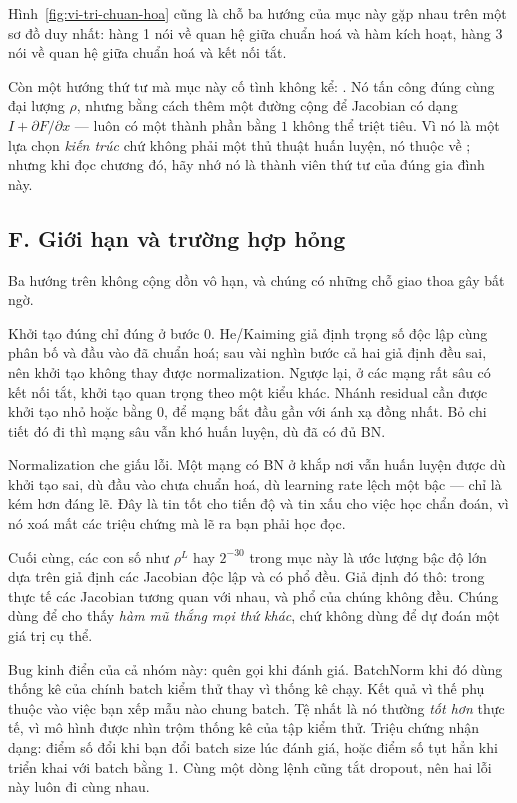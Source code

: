 \documentclass[../../../deep_learning.tex]{subfiles}
\begin{document}
Hình~\ref{fig:vi-tri-chuan-hoa} cũng là chỗ ba hướng của mục này gặp nhau trên một sơ đồ duy nhất: hàng 1 nói về quan hệ giữa chuẩn hoá và hàm kích hoạt, hàng 3 nói về quan hệ giữa chuẩn hoá và kết nối tắt.

Còn một hướng thứ tư mà mục này cố tình không kể: . Nó tấn công đúng cùng đại lượng \(\rho\), nhưng bằng cách thêm một đường cộng để Jacobian có dạng \(I + \partial F/\partial x\) --- luôn có một thành phần bằng \(1\) không thể triệt tiêu. Vì nó là một lựa chọn \emph{kiến trúc} chứ không phải một thủ thuật huấn luyện, nó thuộc về ; nhưng khi đọc chương đó, hãy nhớ nó là thành viên thứ tư của đúng gia đình này.

\subsection{F. Giới hạn và trường hợp hỏng}
Ba hướng trên không cộng dồn vô hạn, và chúng có những chỗ giao thoa gây bất ngờ.

Khởi tạo đúng chỉ đúng ở bước \(0\). He/Kaiming giả định trọng số độc lập cùng phân bố và đầu vào đã chuẩn hoá; sau vài nghìn bước cả hai giả định đều sai, nên khởi tạo không thay được normalization. Ngược lại, ở các mạng rất sâu có kết nối tắt, khởi tạo quan trọng theo một kiểu khác. Nhánh residual cần được khởi tạo nhỏ hoặc bằng \(0\), để mạng bắt đầu gần với ánh xạ đồng nhất. Bỏ chi tiết đó đi thì mạng sâu vẫn khó huấn luyện, dù đã có đủ BN.

Normalization che giấu lỗi. Một mạng có BN ở khắp nơi vẫn huấn luyện được dù khởi tạo sai, dù đầu vào chưa chuẩn hoá, dù learning rate lệch một bậc --- chỉ là kém hơn đáng lẽ. Đây là tin tốt cho tiến độ và tin xấu cho việc học chẩn đoán, vì nó xoá mất các triệu chứng mà lẽ ra bạn phải học đọc.

Cuối cùng, các con số như \(\rho^{L}\) hay \(2^{-30}\) trong mục này là ước lượng bậc độ lớn dựa trên giả định các Jacobian độc lập và có phổ đều. Giả định đó thô: trong thực tế các Jacobian tương quan với nhau, và phổ của chúng không đều. Chúng dùng để cho thấy \emph{hàm mũ thắng mọi thứ khác}, chứ không dùng để dự đoán một giá trị cụ thể.

\begin{cambay}
Bug kinh điển của cả nhóm này: quên gọi  khi đánh giá. BatchNorm khi đó dùng thống kê của chính batch kiểm thử thay vì thống kê chạy. Kết quả vì thế phụ thuộc vào việc bạn xếp mẫu nào chung batch. Tệ nhất là nó thường \emph{tốt hơn} thực tế, vì mô hình được nhìn trộm thống kê của tập kiểm thử. Triệu chứng nhận dạng: điểm số đổi khi bạn đổi batch size lúc đánh giá, hoặc điểm số tụt hẳn khi triển khai với batch bằng \(1\). Cùng một dòng lệnh cũng tắt dropout, nên hai lỗi này luôn đi cùng nhau.
\end{cambay}
\end{document}
